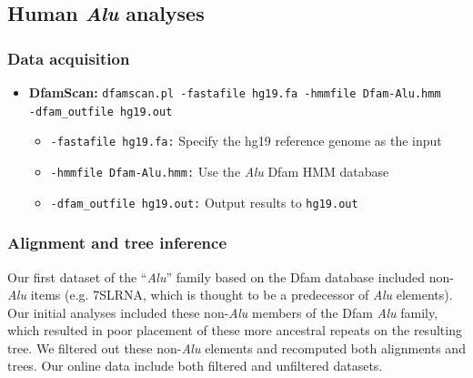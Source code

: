 \subsection{Human \textit{Alu} analyses}
\subsubsection{Data acquisition}\label{sup:aludata}
\begin{itemize}
\item \textbf{DfamScan:} \texttt{dfamscan.pl -fastafile hg19.fa -hmmfile Dfam-Alu.hmm\\-dfam\_outfile hg19.out}
\begin{itemize}
\item \texttt{-fastafile hg19.fa:} Specify the hg19 reference genome as the input
\item \texttt{-hmmfile Dfam-Alu.hmm:} Use the \textit{Alu} Dfam HMM database
\item \texttt{-dfam\_outfile hg19.out:} Output results to \texttt{hg19.out}
\end{itemize}
\end{itemize}

\subsubsection{Alignment and tree inference}\label{sup:alualignment}
Our first dataset of the ``\textit{Alu}'' family based on the Dfam database included non-\textit{Alu} items (e.g. 7SLRNA, which is thought to be a predecessor of \textit{Alu} elements). Our initial analyses included these non-\textit{Alu} members of the Dfam \textit{Alu} family, which resulted in poor placement of these more ancestral repeats on the resulting tree. We filtered out these non-\textit{Alu} elements and recomputed both alignments and trees. Our online data include both filtered and unfiltered datasets. 

